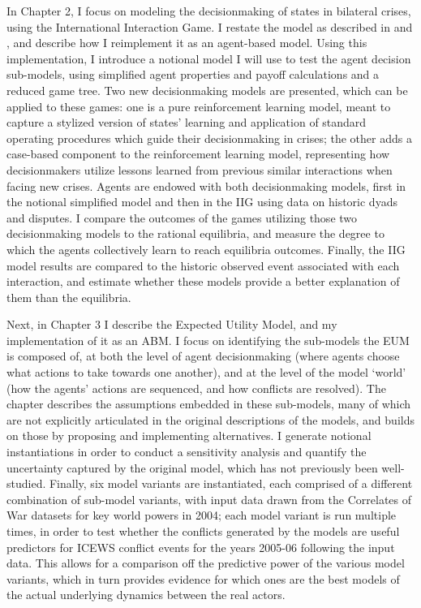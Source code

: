 In Chapter 2, I focus on modeling the decisionmaking of states in bilateral crises, using the International Interaction Game. I restate the model as described in \citet{bdm_1992} and \citet{bennett_2000}, and describe how I reimplement it as an agent-based model. Using this implementation, I introduce a notional model I will use to test the agent decision sub-models, using simplified agent properties and payoff calculations and a reduced game tree. Two new decisionmaking models are presented, which can be applied to these games: one is a pure reinforcement learning model, meant to capture a stylized version of states' learning and application of standard operating procedures which guide their decisionmaking in crises; the other adds a case-based component to the reinforcement learning model, representing how decisionmakers utilize lessons learned from previous similar interactions when facing new crises. Agents are endowed with both decisionmaking models, first in the notional simplified model and then in the IIG using data on historic dyads and disputes. I compare the outcomes of the games utilizing those two decisionmaking models to the rational equilibria, and measure the degree to which the agents collectively learn to reach equilibria outcomes. Finally, the IIG model results are compared to the historic observed event associated with each interaction, and estimate whether these models provide a better explanation of them than the equilibria.

Next, in Chapter 3 I describe the Expected Utility Model, and my implementation of it as an ABM. I focus on identifying the sub-models the EUM is composed of, at both the level of agent decisionmaking (where agents choose what actions to take towards one another), and at the level of the model `world' (how the agents' actions are sequenced, and how conflicts are resolved). The chapter describes the assumptions embedded in these sub-models, many of which are not explicitly articulated in the original descriptions of the models, and builds on those by proposing and implementing alternatives. I generate notional instantiations in order to conduct a sensitivity analysis and quantify the uncertainty captured by the original model, which has not previously been well-studied. Finally, six model variants are instantiated, each comprised of a different combination of sub-model variants, with input data drawn from the Correlates of War datasets for key world powers in 2004; each model variant is run multiple times, in order to test whether the conflicts generated by the models are useful predictors for ICEWS conflict events for the years 2005-06 following the input data. This allows for a comparison off the predictive power of the various model variants, which in turn provides evidence for which ones are the best models of the actual underlying dynamics between the real actors.

